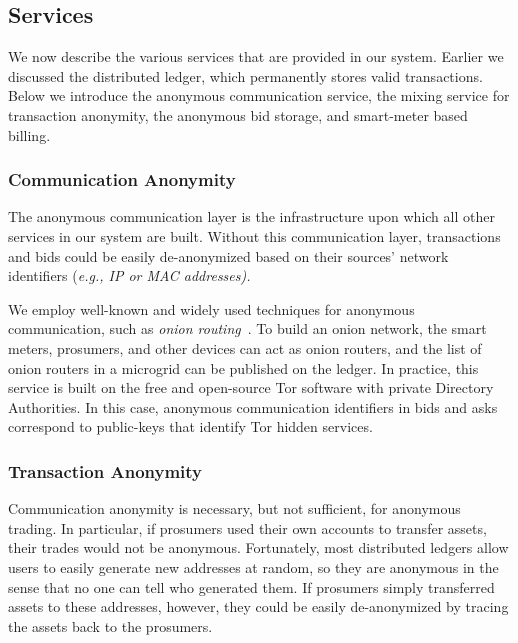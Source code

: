 \subsection{Services}

We now describe the various services that are provided in our system.
Earlier we discussed the distributed ledger, which permanently stores
valid transactions.  Below we introduce the anonymous communication
service, the mixing service for transaction anonymity, the anonymous
bid storage, and smart-meter based billing.

\subsubsection{Communication Anonymity}
The anonymous communication layer is the infrastructure upon which all
other services in our system are built.  Without this communication
layer, transactions and bids could be easily de-anonymized based on
their sources' network identifiers (\em{e.g.}, IP or MAC addresses).

We employ well-known and widely used techniques for anonymous
communication, such as \emph{onion routing}~\cite{reed1998anonymous}.
To build an onion network, the smart meters, prosumers, and other
devices can act as onion routers, and the list of onion routers in a
microgrid can be published on the ledger.  In practice, this service
is built on
the free and open-source Tor software with private Directory
Authorities.  In this case, anonymous communication identifiers in
bids and asks correspond to public-keys that identify Tor hidden
services.

\subsubsection{Transaction Anonymity}
Communication anonymity is necessary, but not sufficient, for
anonymous trading. In particular, if prosumers used their own accounts
to transfer assets, their trades would not be anonymous.  Fortunately,
most distributed ledgers allow users to easily generate new addresses
at random, so they are anonymous in the sense that no one can tell who
generated them.  If prosumers simply transferred assets to these
addresses, however, they could be easily de-anonymized by tracing the
assets back to the prosumers.

